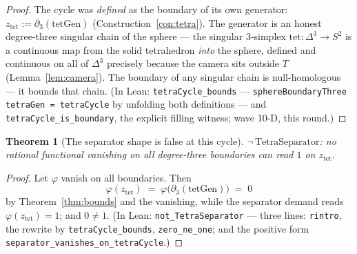 \documentclass[11pt,a4paper]{article}
\theoremstyle{plain}
\newtheorem{theorem}{Theorem}[section]
\theoremstyle{definition}
\begin{document}
\begin{proof}
The cycle was \emph{defined} as the boundary of its own generator:
$z_{\mathrm{tet}} := \partial_3(\mathrm{tetGen})$
(Construction~\ref{con:tetra}).  The generator is an honest
degree-three singular chain of the sphere --- the singular
$3$-simplex $\mathrm{tet} : \Delta^3 \to S^2$ is a continuous map
from the solid tetrahedron \emph{into} the sphere, defined and
continuous on all of $\Delta^3$ precisely because the camera sits
outside $T$ (Lemma~\ref{lem:camera}).  The boundary of any singular
chain is null-homologous --- it bounds that chain.  (In Lean:
\texttt{tetraCycle\_bounds} --- \texttt{sphereBoundaryThree tetraGen
= tetraCycle} by unfolding both definitions --- and
\texttt{tetraCycle\_is\_boundary}, the explicit filling witness;
wave 10-D, this round.)
\end{proof}

\begin{theorem}[The separator shape is false at this cycle]
\label{thm:not-separator}
$\neg\,\mathrm{TetraSeparator}$: no rational functional vanishing on
all degree-three boundaries can read $1$ on
$z_{\mathrm{tet}}$.
\end{theorem}

\begin{proof}
Let $\varphi$ vanish on all boundaries.  Then
\[
\varphi(z_{\mathrm{tet}}) \;=\;
\varphi\bigl( \partial_3(\mathrm{tetGen}) \bigr) \;=\; 0
\]
by Theorem~\ref{thm:bounds} and the vanishing, while the separator
demand reads $\varphi(z_{\mathrm{tet}}) = 1$; and $0 \ne 1$.  (In
Lean: \texttt{not\_TetraSeparator} --- three lines:
\texttt{rintro}, the rewrite by \texttt{tetraCycle\_bounds},
\texttt{zero\_ne\_one}; and the positive form
\texttt{separator\_vanishes\_on\_tetraCycle}.)
\end{proof}
\end{document}
